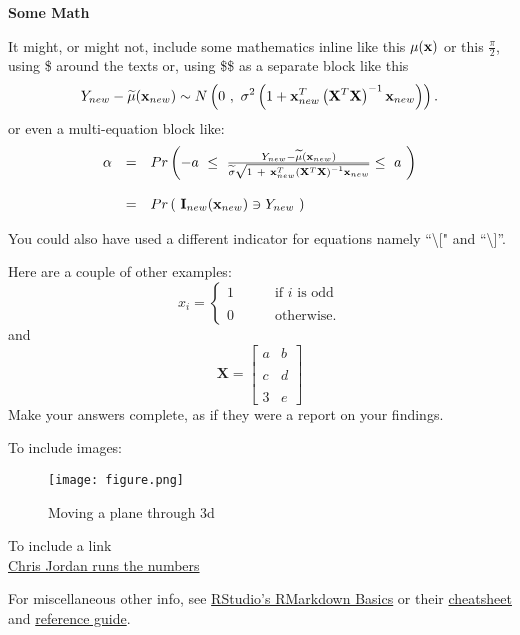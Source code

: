 \documentclass[]{article}
\begin{document}
\textbf{Some Math}

It might, or might not, include some mathematics inline like this
\(\mu({\bf x})\) or this \(\frac{\pi}{2}\), using \$ around the texts
or, using \$\$ as a separate block like this \[
Y_{new} - \widetilde{\mu}({\bf x}_{new}) \sim N\left(0 ~,~ \sigma^2 \left( 1 + {\bf x}_{new}^T\left( {\bf X}^T{\bf X} \right)^{-1}
                      {\bf x}_{new} \right) \right).
\] or even a multi-equation block like: \[
\begin{array}{rcl}
\alpha & = & Pr\left(-a ~\le~ 
\frac{ Y_{new} - \widetilde{\mu}({\bf x}_{new}) 
              }
     {\widetilde{\sigma} \sqrt{ 1 ~+~
      {\bf x}^T_{new}
             \left( {\bf X}^T{\bf X} \right)^{-1}
             {\bf x}_{new}
             }
     }
     \le ~a~ \right) \\
&& \\
&=& Pr \left(~ {\bf I}_{new}({\bf x}_{new})
            \ni Y_{new} 
        ~\right)
\end{array}
\]

You could also have used a different indicator for equations namely
``\textbackslash{}{[}" and ``\textbackslash{}{]}''.

Here are a couple of other examples: \[
x_i = 
\left\{  \begin{array}{lcl}
          1  & ~~~~~~ & \text{if } i \text{  is odd} \\
          &&\\
          0 & & \text{otherwise.}
          \end{array}
\right.
\] and \[
\mathbf{X} = 
\left[ \begin{array}{cc}
a & b \\
&\\
c&d \\
&\\
3 & e 
\end{array}
\right]
\] Make your answers complete, as if they were a report on your
findings.

To include images:

\begin{figure}
\centering
\texttt{[image: figure.png]}
\caption{Moving a plane through 3d}
\end{figure}

To include a link\\
\color{blue} \href{http://www.chrisjordan.com/gallery/rtn2/\#tuna}{Chris
Jordan runs the numbers} \color{black}

For miscellaneous other info, see \color{blue}
\href{http://rmarkdown.rstudio.com/authoring_basics.html}{RStudio's
RMarkdown Basics} \color{black} or their \color{blue}
\href{https://www.rstudio.com/wp-content/uploads/2015/02/rmarkdown-cheatsheet.pdf}{cheatsheet}
\color{black} and \color{blue}
\href{https://www.rstudio.com/wp-content/uploads/2015/03/rmarkdown-reference.pdf}{reference
guide}\color{black}.
\end{document}
